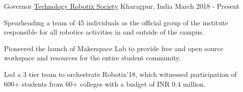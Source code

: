 \begin{cventries}
    \cventry
    {Governor} %
    {\href{https://www.robotix.in/}{Technology Robotix Society}} %
    {Kharagpur, India} %
    {March 2018 - Present} %
    {
      \begin{cvitems} %
        \item {Spearheading a team of 45 individuals as the official group of the institute responsible for all robotics activities in and outside of the campus.}
        \item {Pioneered the launch of Makerspace Lab to provide free and open source workspace and resources for the entire student community.}
        \item {Led a 3 tier team to orchestrate Robotix'18, which witnessed participation of 600+ students from 60+ colleges with a budget of INR 0.4 million.}
      \end{cvitems}
    }
    
    

\end{cventries}
